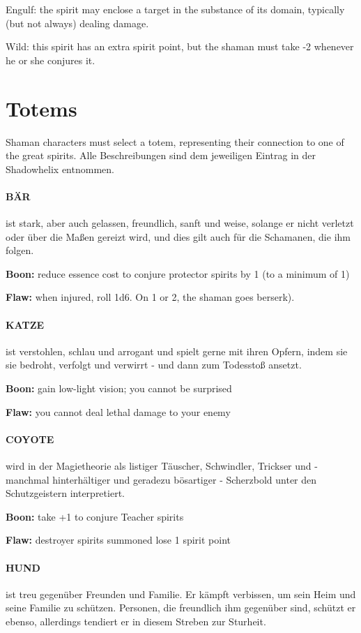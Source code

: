 Engulf: the spirit may enclose a target in the substance of its domain, typically (but not always) dealing damage.

Wild: this spirit has an extra spirit point, but the shaman must take -2 whenever he or she conjures it.



\section{Totems}

Shaman characters must select a totem, representing their connection to one of the great spirits. Alle Beschreibungen sind dem jeweiligen Eintrag in der Shadowhelix entnommen.

\paragraph{BÄR} ist stark, aber auch gelassen, freundlich, sanft und weise, solange er nicht verletzt oder über die Maßen gereizt wird, und dies gilt auch für die Schamanen, die ihm folgen.

\textbf{Boon:} reduce essence cost to conjure protector spirits by 1 (to a minimum of 1)

\textbf{Flaw:} when injured, roll 1d6. On 1 or 2, the shaman goes berserk).


\paragraph{KATZE} ist verstohlen, schlau und arrogant und spielt gerne mit ihren Opfern, indem sie sie bedroht, verfolgt und verwirrt - und dann zum Todesstoß ansetzt.

\textbf{Boon:} gain low-light vision; you cannot be surprised

\textbf{Flaw:} you cannot deal lethal damage to your enemy


\paragraph{COYOTE} wird in der Magietheorie als listiger Täuscher, Schwindler, Trickser und - manchmal hinterhältiger und geradezu bösartiger - Scherzbold unter den Schutzgeistern interpretiert. 

\textbf{Boon:} take +1 to conjure Teacher spirits

\textbf{Flaw:} destroyer spirits summoned lose 1 spirit point


\paragraph{HUND} ist treu gegenüber Freunden und Familie. Er kämpft verbissen, um sein Heim und seine Familie zu schützen. Personen, die freundlich ihm gegenüber sind, schützt er ebenso, allerdings tendiert er in diesem Streben zur Sturheit.

